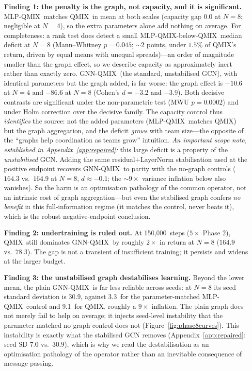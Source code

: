 \documentclass[10pt]{article}
\newcommand{\algoname}[1]{\textsc{#1}}
\newcommand{\qmix}{\algoname{QMIX}}
\newcommand{\gnnqmix}{\algoname{GNN-QMIX}}
\newcommand{\mlpqmix}{\algoname{MLP-QMIX}}
\newcommand{\PEsteps}{150{,}000}      %
\newcommand{\PEqmixNeight}{164.9}
\newcommand{\PEgnnNeight}{78.3}
\newcommand{\PEgraphGapNfour}{-10.6}  %
\newcommand{\PEgraphGapNeight}{-86.6} %
\newcommand{\PEgraphDNfour}{-3.2}     %
\newcommand{\PEgraphDNeight}{-3.9}    %
\newcommand{\PEcapGapNeight}{0.0}     %
\newcommand{\PEmwuP}{0.0002}          %
\newcommand{\PEgnnSDNeight}{30.9}     %
\newcommand{\PEmlpSDNeight}{3.3}      %
\newcommand{\PEqmixSDNeight}{9.1}     %
\begin{document}
\textbf{Finding 1: the penalty is the graph, not capacity, and it is
significant.} \mlpqmix\ matches \qmix\ in mean at both scales (capacity gap
$\PEcapGapNeight$ at $N=8$; negligible at $N=4$), so the extra parameters
alone add nothing on average. For completeness: a rank test does detect a
small \mlpqmix-below-\qmix\ median deficit at $N{=}8$ (Mann--Whitney
$p=0.045$; ${\sim}2$ points, under $1.5\%$ of \qmix's return, driven by
equal means with unequal spreads)---an order of magnitude smaller than the
graph effect, so we describe capacity as approximately inert rather than
exactly zero. \gnnqmix\ (the standard, unstabilised GCN), with identical
parameters but the graph added, is far worse: the graph effect is
$\PEgraphGapNfour$ at $N=4$ and
$\PEgraphGapNeight$ at $N=8$ (Cohen's $d=\PEgraphDNfour$ and
$\PEgraphDNeight$). Both decisive contrasts are significant under the
non-parametric test ($\text{MWU } p=\PEmwuP$) and under Holm correction
over the decisive family. The capacity control thus \emph{identifies} the
source: not the added parameters (\mlpqmix\ matches \qmix) but the graph
aggregation, and the deficit \emph{grows} with team size---the opposite of
the ``graphs help coordination as teams grow'' intuition. \emph{An important
scope note, established in Appendix~\ref{app:repaired}:} this large deficit
is a property of the \emph{unstabilised} GCN. Adding the same residual$+$LayerNorm
stabilisation used at the positive endpoint recovers \gnnqmix\ to parity
with the no-graph controls ($164.3$ vs.\ $164.9$ at $N{=}8$, $d\approx-0.1$;
the ${\sim}9\times$ variance inflation below also vanishes). So the harm is
an optimisation pathology of the common operator, not an intrinsic cost of
graph aggregation---but even the stabilised graph confers \emph{no benefit}
in this full-information regime (it matches the control, never beats it),
which is the robust negative-endpoint conclusion.

\textbf{Finding 2: undertraining is ruled out.} At \PEsteps\ steps
($5\times$ Phase 2), \qmix\ still dominates \gnnqmix\ by roughly $2\times$
in return at $N=8$ ($\PEqmixNeight$ vs.\ $\PEgnnNeight$). The gap is not a
transient of insufficient training; it persists and widens at the larger
budget.

\textbf{Finding 3: the unstabilised graph destabilises learning.} Beyond the
lower mean, the plain \gnnqmix\ is far less reliable across seeds: at $N=8$ its
seed standard deviation is \PEgnnSDNeight, against \PEmlpSDNeight\ for the
parameter-matched \mlpqmix\ control and \PEqmixSDNeight\ for \qmix, roughly a
$9\times$ inflation. The plain graph
does not merely fail to help on average; it injects seed-level
instability that the parameter-matched no-graph control does not
(Figure~\ref{fig:phase8curves}). This instability is exactly what the
stabilised GCN removes (Appendix~\ref{app:repaired}: seed SD $7.0$ vs.\
$30.9$), which is why we read the destabilisation as an optimisation
pathology of the operator rather than an inevitable consequence of message
passing.
\end{document}
